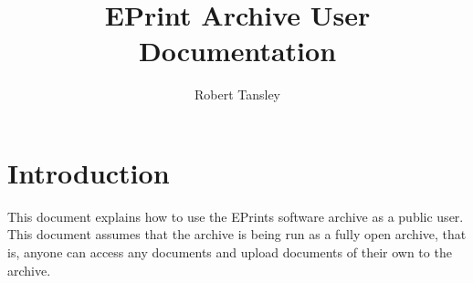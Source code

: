 \documentclass[a4paper]{article}
\title{EPrint Archive User Documentation}
\author{Robert Tansley}
\begin{document}
\maketitle

\section{Introduction}

This document explains how to use the EPrints software archive as a public user. This document assumes that the archive is being run as a fully open archive, that is, anyone can access any documents and upload documents of their own to the archive.





\end{document}
